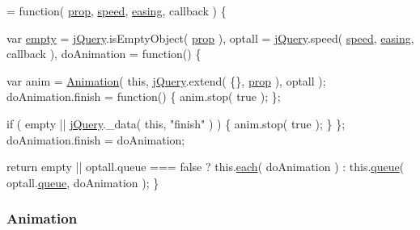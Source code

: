 \begin{DoxyCode}
= \textcolor{keyword}{function}( \hyperlink{jquery-1_810_82-vsdoc_8js_af17be84954030af6c2286f5da385d41b}{prop}, \hyperlink{jquery-1_810_82-vsdoc_8js_add98c90065e6563cba26ff6d2016c46c}{speed}, \hyperlink{jquery-1_810_82-vsdoc_8js_a9758a312629fa6de1744280dd6e6253b}{easing}, callback ) \{


        var \hyperlink{jquery-1_810_82-vsdoc_8js_ad242f812bdc5013e0cbf15d6e4d6800a}{empty} = \hyperlink{jquery-1_810_82-vsdoc_8js_add5237586d970a38a81f990e8eb28c6c}{jQuery}.isEmptyObject( \hyperlink{jquery-1_810_82-vsdoc_8js_af17be84954030af6c2286f5da385d41b}{prop} ),
            optall = \hyperlink{jquery-1_810_82-vsdoc_8js_add5237586d970a38a81f990e8eb28c6c}{jQuery}.speed( \hyperlink{jquery-1_810_82-vsdoc_8js_add98c90065e6563cba26ff6d2016c46c}{speed}, \hyperlink{jquery-1_810_82-vsdoc_8js_a9758a312629fa6de1744280dd6e6253b}{easing}, callback ),
            doAnimation = \textcolor{keyword}{function}() \{
                
                var anim = \hyperlink{jquery-1_810_82-vsdoc_8js_a3299b781c8ec8287357326920ab3565a}{Animation}( \textcolor{keyword}{this}, \hyperlink{jquery-1_810_82-vsdoc_8js_add5237586d970a38a81f990e8eb28c6c}{jQuery}.extend( \{\}, 
      \hyperlink{jquery-1_810_82-vsdoc_8js_af17be84954030af6c2286f5da385d41b}{prop} ), optall );
                doAnimation.finish = \textcolor{keyword}{function}() \{
                    anim.stop( \textcolor{keyword}{true} );
                \};
                
                \textcolor{keywordflow}{if} ( empty || \hyperlink{jquery-1_810_82-vsdoc_8js_add5237586d970a38a81f990e8eb28c6c}{jQuery}.\_data( \textcolor{keyword}{this}, \textcolor{stringliteral}{"finish"} ) ) \{
                    anim.stop( \textcolor{keyword}{true} );
                \}
            \};
            doAnimation.finish = doAnimation;

        \textcolor{keywordflow}{return} empty || optall.queue === \textcolor{keyword}{false} ?
            this.\hyperlink{jquery-1_810_82-vsdoc_8js_aae0bcb6b00035445a8f9b262c96ea8a2}{each}( doAnimation ) :
            this.\hyperlink{jquery-1_810_82-vsdoc_8js_a4a4ce67ab280eb2cff0622a3bdc1f5b3}{queue}( optall.\hyperlink{jquery-1_810_82-vsdoc_8js_a4a4ce67ab280eb2cff0622a3bdc1f5b3}{queue}, doAnimation );
    \}
\end{DoxyCode}
\hypertarget{jquery-1_810_82-vsdoc_8js_a3299b781c8ec8287357326920ab3565a}{
\subsubsection[{Animation}]{ Animation}}\label{jquery-1_810_82-vsdoc_8js_a3299b781c8ec8287357326920ab3565a}
